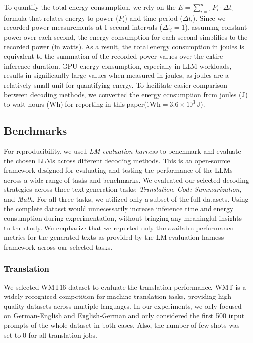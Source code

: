 To quantify the total energy consumption, we rely on the \( E = \sum_{i=1}^{n} P_i \cdot \Delta t_i\) formula that relates energy to power (\( P_i\)) and time period (\(\Delta t_i\)). Since we recorded power measurements at 1-second intervals (\(\Delta t_i = 1\)), assuming constant power over each second, the energy consumption for each second simplifies to the recorded power (in watts). As a result, the total energy consumption in joules is equivalent to the summation of the recorded power values over the entire inference duration. GPU energy consumption, especially in LLM workloads, results in significantly large values when measured in joules, as joules are a relatively small unit for quantifying energy. To facilitate easier comparison between decoding methods, we converted the energy consumption from joules (J) to watt-hours (Wh) for reporting in this paper(\( 1\mathrm{Wh} = 3.6 \times 10^3 \, \mathrm{J}\)).

\subsection{Benchmarks}

For reproducibility, we used \textit{LM-evaluation-harness} \cite{eval-harness} to benchmark and evaluate the chosen LLMs across different decoding methods. This is an open-source framework designed for evaluating and testing the performance of the LLMs across a wide range of tasks and benchmarks. We evaluated our selected decoding strategies across three text generation tasks: \textit{Translation}, \textit{Code Summarization}, and \textit{Math}. For all three tasks, we utilized only a subset of the full datasets. Using the complete dataset would unnecessarily increase inference time and energy consumption during experimentation, without bringing any meaningful insights to the study. We emphasize that we reported only the available performance metrics for the generated texts as provided by the LM-evaluation-harness framework across our selected tasks.   

\subsubsection{Translation}

We selected WMT16 \cite{wmt2016} dataset to evaluate the translation performance. WMT is a widely recognized competition for machine translation tasks, providing high-quality datasets across multiple languages. In our experiments, we only focused on German-English and English-German and only considered the first 500 input prompts of the whole dataset in both cases. Also, the number of few-shots was set to 0 for all translation jobs. 

